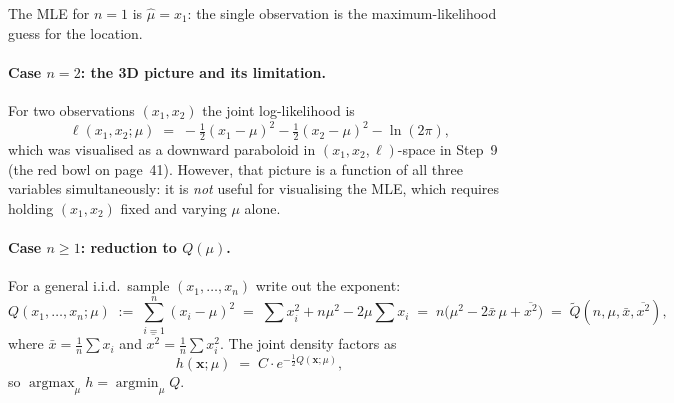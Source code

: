 \documentclass[a4paper,oneside,12pt]{extarticle}
\theoremstyle{plain}
\theoremstyle{definition}
\theoremstyle{remark}
\begin{document}
\begin{center}
\end{center}

The MLE for $n=1$ is $\hat\mu = x_1$: the single observation is the
maximum-likelihood guess for the location.

\paragraph{Case $n=2$: the 3D picture and its limitation.}
For two observations $(x_1,x_2)$ the joint log-likelihood is
\[
  \ell(x_1,x_2;\mu)
  \;=\; -\tfrac{1}{2}(x_1-\mu)^2 - \tfrac{1}{2}(x_2-\mu)^2 - \ln(2\pi),
\]
which was visualised as a downward paraboloid in $(x_1,x_2,\ell)$-space
in Step~9 (the red bowl on page~41).  However, that picture is a
function of all three variables simultaneously: it is \emph{not}
useful for visualising the MLE, which requires holding $(x_1,x_2)$
fixed and varying $\mu$ alone.

\paragraph{Case $n\geq 1$: reduction to $Q(\mu)$.}
For a general i.i.d.\ sample $(x_1,\ldots,x_n)$ write out the
exponent:
\[
  Q(x_1,\ldots,x_n;\mu)
  \;:=\; \sum_{i=1}^n(x_i-\mu)^2
  \;=\; \sum x_i^2 + n\mu^2 - 2\mu\sum x_i
  \;=\; n\bigl(\mu^2 - 2\bar x\,\mu + \overline{x^2}\bigr)
  \;=\; \tilde Q(n,\mu,\bar x, \overline{x^2}),
\]
where $\bar x = \frac{1}{n}\sum x_i$ and $\overline{x^2} =
\frac{1}{n}\sum x_i^2$.  The joint density factors as
\[
  h(\mathbf{x};\mu)
  \;=\; C\cdot e^{-\frac{1}{2}Q(\mathbf{x};\mu)},
\]
so $\operatorname{argmax}_\mu h = \operatorname{argmin}_\mu Q$.
\end{document}
